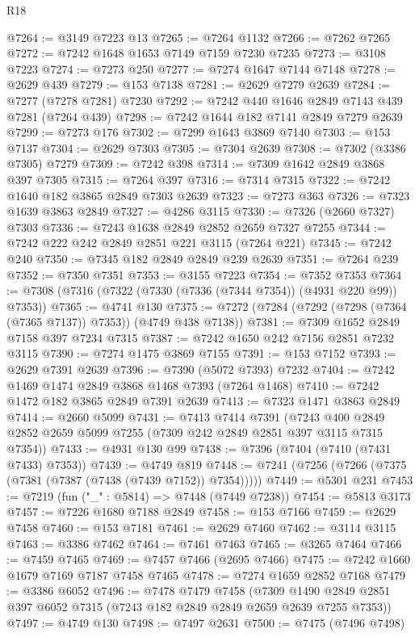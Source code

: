 \begin{lexlean}{R18}
\begin{coremodule}
@7264 := @3149 @7223 @13
@7265 := @7264 @1132
@7266 := @7262 @7265
@7272 := @7242 @1648 @1653 @7149 @7159 @7230 @7235
@7273 := @3108 @7223
@7274 := @7273 @250
@7277 := @7274 @1647 @7144 @7148
@7278 := @2629 @439
@7279 := @153 @7138
@7281 := @2629 @7279 @2639
@7284 := @7277 (@7278 @7281) @7230
@7292 := @7242 @440 @1646 @2849 @7143 @439 @7281 (@7264 @439)
@7298 := @7242 @1644 @182 @7141 @2849 @7279 @2639
@7299 := @7273 @176
@7302 := @7299 @1643 @3869 @7140
@7303 := @153 @7137
@7304 := @2629 @7303
@7305 := @7304 @2639
@7308 := @7302 (@3386 @7305) @7279
@7309 := @7242 @398
@7314 := @7309 @1642 @2849 @3868 @397 @7305
@7315 := @7264 @397
@7316 := @7314 @7315
@7322 := @7242 @1640 @182 @3865 @2849 @7303 @2639
@7323 := @7273 @363
@7326 := @7323 @1639 @3863 @2849
@7327 := @4286 @3115
@7330 := @7326 (@2660 @7327) @7303
@7336 := @7243 @1638 @2849 @2852 @2659 @7327 @7255
@7344 := @7242 @222 @242 @2849 @2851 @221 @3115 (@7264 @221)
@7345 := @7242 @240
@7350 := @7345 @182 @2849 @2849 @239 @2639
@7351 := @7264 @239
@7352 := @7350 @7351
@7353 := @3155 @7223
@7354 := @7352 @7353
@7364 := @7308 (@7316 (@7322 (@7330 (@7336 (@7344 @7354)) (@4931 @220 @99)) @7353))
@7365 := @4741 @130
@7375 := @7272 (@7284 (@7292 (@7298 (@7364 (@7365 @7137)) @7353)) (@4749 @438 @7138))
@7381 := @7309 @1652 @2849 @7158 @397 @7234 @7315
@7387 := @7242 @1650 @242 @7156 @2851 @7232 @3115
@7390 := @7274 @1475 @3869 @7155
@7391 := @153 @7152
@7393 := @2629 @7391 @2639
@7396 := @7390 (@5072 @7393) @7232
@7404 := @7242 @1469 @1474 @2849 @3868 @1468 @7393 (@7264 @1468)
@7410 := @7242 @1472 @182 @3865 @2849 @7391 @2639
@7413 := @7323 @1471 @3863 @2849
@7414 := @2660 @5099
@7431 := @7413
    @7414
    @7391
    (@7243 @400 @2849 @2852 @2659 @5099 @7255 (@7309 @242 @2849 @2851 @397 @3115 @7315 @7354))
@7433 := @4931 @130 @99
@7438 := @7396 (@7404 (@7410 (@7431 @7433) @7353))
@7439 := @4749 @819
@7448 := @7241 (@7256 (@7266 (@7375 (@7381 (@7387 (@7438 (@7439 @7152)) @7354)))))
@7449 := @5301 @231
@7453 := @7219 (fun ("_" : @5814) => @7448 (@7449 @7238))
@7454 := @5813 @3173
@7457 := @7226 @1680 @7188 @2849
@7458 := @153 @7166
@7459 := @2629 @7458
@7460 := @153 @7181
@7461 := @2629 @7460
@7462 := @3114 @3115
@7463 := @3386 @7462
@7464 := @7461 @7463
@7465 := @3265 @7464
@7466 := @7459 @7465
@7469 := @7457 @7466 (@2695 @7466)
@7475 := @7242 @1660 @1679 @7169 @7187 @7458 @7465
@7478 := @7274 @1659 @2852 @7168
@7479 := @3386 @6052
@7496 := @7478
    @7479
    @7458
    (@7309 @1490 @2849 @2851 @397 @6052 @7315 (@7243 @182 @2849 @2849 @2659 @2639 @7255 @7353))
@7497 := @4749 @130
@7498 := @7497 @2631
@7500 := @7475 (@7496 @7498)

\end{coremodule}
\end{lexlean}
